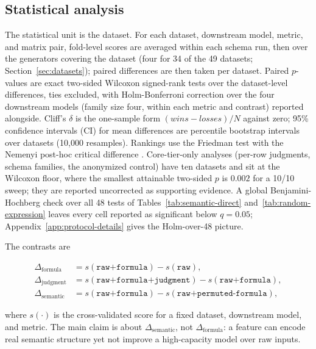 \subsection{Statistical analysis}\label{sec:statistical-analysis}

The statistical unit is the dataset. For each dataset, downstream model, metric, and matrix pair, fold-level scores are averaged within each schema run, then over the generators covering the dataset (four for 34 of the 49 datasets; Section~\ref{sec:datasets}); paired differences are then taken per dataset. Paired \(p\)-values are exact two-sided Wilcoxon signed-rank tests over the dataset-level differences, ties excluded, with Holm-Bonferroni correction over the four downstream models (family size four, within each metric and contrast) reported alongside. Cliff's \(\delta\) is the one-sample form \((wins - losses)/N\) against zero; 95\% confidence intervals (CI) for mean differences are percentile bootstrap intervals over datasets (10,000 resamples). Rankings use the Friedman test with the Nemenyi post-hoc critical difference \citep{demsar2006statistical}. Core-tier-only analyses (per-row judgments, schema families, the anonymized control) have ten datasets and sit at the Wilcoxon floor, where the smallest attainable two-sided \(p\) is \(0.002\) for a 10/10 sweep; they are reported uncorrected as supporting evidence. A global Benjamini-Hochberg check over all 48 tests of Tables~\ref{tab:semantic-direct} and~\ref{tab:random-expression} leaves every cell reported as significant below \(q = 0.05\); Appendix~\ref{app:protocol-details} gives the Holm-over-48 picture.

The contrasts are

\begin{align}
\Delta_{\mathrm{formula}}  &= s(\texttt{raw+formula}) - s(\texttt{raw}), \label{eq:formula}\\
\Delta_{\mathrm{judgment}} &= s(\texttt{raw+formula+judgment}) - s(\texttt{raw+formula}), \label{eq:judgment}\\
\Delta_{\mathrm{semantic}} &= s(\texttt{raw+formula}) - s(\texttt{raw+permuted-formula}), \label{eq:semantic}
\end{align}

where \(s( \cdot )\) is the cross-validated score for a fixed dataset, downstream model, and metric. The main claim is about \(\Delta_{\mathrm{semantic}}\), not \(\Delta_{\mathrm{formula}}\): a feature can encode real semantic structure yet not improve a high-capacity model over raw inputs.

